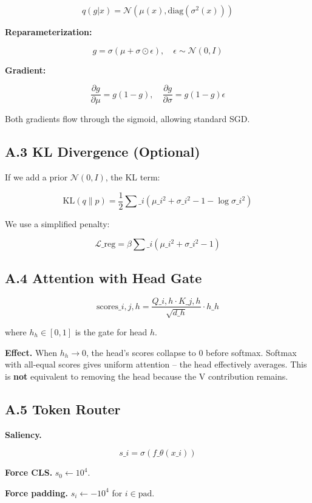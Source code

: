 \[
q(g | x) = \mathcal{N}(\mu(x), \text{diag}(\sigma^2(x)))
\tag{A.3}
\]

\textbf{Reparameterization:}

\[
g = \sigma(\mu + \sigma \odot \epsilon), \quad \epsilon \sim \mathcal{N}(0, I)
\tag{A.4}
\]

\textbf{Gradient:}

\[
\frac{\partial g}{\partial \mu} = g(1 - g), \quad
\frac{\partial g}{\partial \sigma} = g(1 - g) \epsilon
\tag{A.5}
\]

Both gradients flow through the sigmoid, allowing standard SGD.

\subsection{A.3 KL Divergence (Optional)}

If we add a prior $\mathcal{N}(0, I)$, the KL term:

\[
\text{KL}(q \| p) = \frac{1}{2} \sum\_i \left(\mu\_i^2 + \sigma\_i^2 - 1 - \log \sigma\_i^2\right)
\tag{A.6}
\]

We use a simplified penalty:

\[
\mathcal{L}\_\text{reg} = \beta \sum\_i (\mu\_i^2 + \sigma\_i^2 - 1)
\tag{A.7}
\]

\subsection{A.4 Attention with Head Gate}

\[
\text{scores}\_{i, j, h} = \frac{Q\_{i, h} \cdot K\_{j, h}}{\sqrt{d\_h}} \cdot h\_h
\tag{A.8}
\]

where $h_h \in [0, 1]$ is the gate for head $h$.

\textbf{Effect.} When $h_h \to 0$, the head's scores collapse to 0 before softmax. 
Softmax with all-equal scores gives uniform attention -- the head 
effectively averages. This is \textbf{not} equivalent to removing the head 
because the V contribution remains.

\subsection{A.5 Token Router}

\textbf{Saliency.}

\[
s\_i = \sigma(f\_\theta(x\_i))
\tag{A.9}
\]

\textbf{Force CLS.} $s_0 \leftarrow 10^4$.

\textbf{Force padding.} $s_i \leftarrow -10^4$ for $i \in \text{pad}$.

